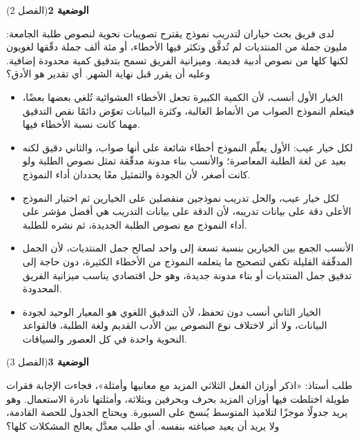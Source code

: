 \documentclass[11pt,a4paper]{article}
\begin{document}
\par\vspace{6pt}
\noindent
{\large\khatt\textbf{الوضعية 2}}\hfill{\small(الفصل 2)}\par\nopagebreak\vspace{3pt}
\setlength{\fboxsep}{7pt}\colorbox{gray!10}{\parbox{\dimexpr\linewidth-14pt}{لدى فريق بحث خياران لتدريب نموذج يقترح تصويبات نحوية لنصوص طلبة الجامعة: مليون جملة من المنتديات لم تُدقَّق وتكثر فيها الأخطاء، أو مئة ألف جملة دقّقها لغويون لكنها كلها من نصوص أدبية قديمة. وميزانية الفريق تسمح بتدقيق كمية محدودة إضافية. وعليه أن يقرر قبل نهاية الشهر. أي تقدير هو الأدق؟}}\par\nopagebreak
\begin{itemize}[leftmargin=1.0cm, labelsep=6pt, itemsep=3pt, topsep=4pt, parsep=0pt]
  \item[\textbf{أ)}] الخيار الأول أنسب، لأن الكمية الكبيرة تجعل الأخطاء العشوائية تُلغي بعضها بعضًا، فيتعلم النموذج الصواب من الأنماط الغالبة، وكثرة البيانات تعوّض دائمًا نقص التدقيق مهما كانت نسبة الأخطاء فيها.
  \item[\textbf{ب)}] لكل خيار عيب: الأول يعلّم النموذج أخطاء شائعة على أنها صواب، والثاني دقيق لكنه بعيد عن لغة الطلبة المعاصرة؛ والأنسب بناء مدونة مدقّقة تمثل نصوص الطلبة ولو كانت أصغر، لأن الجودة والتمثيل معًا يحددان أداء النموذج.
  \item[\textbf{ج)}] لكل خيار عيب، والحل تدريب نموذجين منفصلين على الخيارين ثم اختيار النموذج الأعلى دقة على بيانات تدريبه، لأن الدقة على بيانات التدريب هي أفضل مؤشر على أداء النموذج مع نصوص الطلبة الجديدة، ثم نشره للطلبة.
  \item[\textbf{د)}] الأنسب الجمع بين الخيارين بنسبة تسعة إلى واحد لصالح جمل المنتديات، لأن الجمل المدقّقة القليلة تكفي لتصحيح ما يتعلمه النموذج من الأخطاء الكثيرة، دون حاجة إلى تدقيق جمل المنتديات أو بناء مدونة جديدة، وهو حل اقتصادي يناسب ميزانية الفريق المحدودة.
  \item[\textbf{هـ)}] الخيار الثاني أنسب دون تحفظ، لأن التدقيق اللغوي هو المعيار الوحيد لجودة البيانات، ولا أثر لاختلاف نوع النصوص بين الأدب القديم ولغة الطلبة، فالقواعد النحوية واحدة في كل العصور والسياقات.
\end{itemize}
\par\vspace{6pt}
\noindent
{\large\khatt\textbf{الوضعية 3}}\hfill{\small(الفصل 3)}\par\nopagebreak\vspace{3pt}
\setlength{\fboxsep}{7pt}\colorbox{gray!10}{\parbox{\dimexpr\linewidth-14pt}{طلب أستاذ: «اذكر أوزان الفعل الثلاثي المزيد مع معانيها وأمثلة»، فجاءت الإجابة فقرات طويلة اختلطت فيها أوزان المزيد بحرف وبحرفين وبثلاثة، وأمثلتها نادرة الاستعمال. وهو يريد جدولًا موجزًا لتلاميذ المتوسط يُنسخ على السبورة. ويحتاج الجدول للحصة القادمة، ولا يريد أن يعيد صياغته بنفسه. أي طلب معدَّل يعالج المشكلات كلها؟}}\par\nopagebreak
\end{document}
